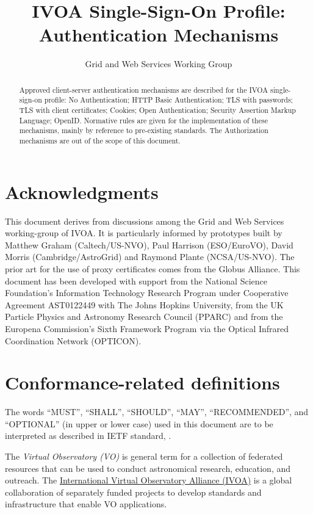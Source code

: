 \documentclass[11pt,a4paper]{ivoa}
\title{IVOA Single-Sign-On Profile: Authentication Mechanisms}
\author{Grid and Web Services  Working Group}
\begin{document}
\begin{abstract}
Approved client-server authentication mechanisms are described for the IVOA single-sign-on profile: No Authentication; HTTP Basic Authentication; TLS with passwords; TLS with client certificates; Cookies; Open Authentication; Security Assertion Markup Language; OpenID. Normative rules are given for the implementation of these mechanisms, mainly by reference to pre-existing standards. The Authorization mechanisms are out of the scope of this document.
\end{abstract}


\section*{Acknowledgments}

This document derives from discussions among the Grid and Web Services working-group of IVOA. It is particularly informed by prototypes built by Matthew Graham (Caltech/US-NVO), Paul Harrison (ESO/EuroVO), David Morris (Cambridge/AstroGrid) and Raymond Plante (NCSA/US-NVO). The prior art for the use of proxy certificates comes from the Globus Alliance.
This document has been developed with support from the National Science Foundation's Information Technology Research Program under Cooperative Agreement AST0122449 with The Johns Hopkins University, from the UK Particle Physics and Astronomy Research Council (PPARC) and from the Europena Commission's Sixth Framework Program via the Optical Infrared Coordination Network (OPTICON).


\section*{Conformance-related definitions}
The words ``MUST'', ``SHALL'', ``SHOULD'', ``MAY'', ``RECOMMENDED'', and
``OPTIONAL'' (in upper or lower case) used in this document are to be
interpreted as described in IETF standard, \citet{std:RFC2119}.

The \emph{Virtual Observatory (VO)} is
general term for a collection of federated resources that can be used
to conduct astronomical research, education, and outreach.
The \href{http://www.ivoa.net}{International
Virtual Observatory Alliance (IVOA)} is a global
collaboration of separately funded projects to develop standards and
infrastructure that enable VO applications.
\end{document}
